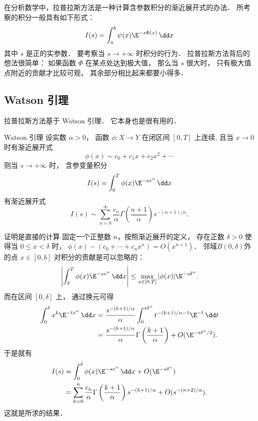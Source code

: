 

在分析数学中，拉普拉斯方法是一种计算含参数积分的渐近展开式的办法． 所考察的积分一般具有如下形式：
\begin{equation}\label{LapAsm_eq1}
I(s)=\int_a^b\psi(x)\E^{-s\Phi(x)}\,\dd x
\end{equation}
其中 $s$ 是正的实参数． 要考察当 $s\to+\infty$ 时积分的行为． 拉普拉斯方法背后的想法很简单： 如果函数 $\Phi$ 在某点处达到极大值， 那么当 $s$ 很大时， 只有极大值点附近的贡献才比较可观， 其余部分相比起来都要小得多．

\subsection{Watson 引理}
拉普拉斯方法基于 Watson 引理． 它本身也是很有用的．

\begin{lemma}{Watson 引理}
设实数 $\alpha>0$， 函数 $\phi:X\to Y$ 在闭区间 $[0,T]$ 上连续, 且当 $x\to0$ 时有渐近展开式
\[
  \phi(x)\sim c_0+c_1x+c_2x^2+\cdots
\]
则当 $s\to+\infty$ 时， 含参变量积分
\[
  I(s)=\int_0^T \phi(x)\E^{-s x^\alpha}\,\dd x
\]
有渐近展开式
\[
  I(s)\sim\sum_{n=0}^\infty \frac{c_n}{\alpha}\Gamma\left(\frac{n+1}{\alpha}\right)s^{-(n+1)/\alpha}.
\]
\end{lemma}

证明是直接的计算 固定一个正整数 $n$，按照渐近展开的定义， 存在正数 $\delta >0$ 使得当 $0\leq x<\delta$ 时， $\phi(x)-(c_0+\cdots+c_nx^n)=O(x^{n+1})$． 邻域$B(0,\delta)$外的点 $x\in[0,b]$ 对积分的贡献是可以忽略的：
\[
  \left|\int_\delta^T\phi(x)\E^{-sx^\alpha}\,\dd x\right|
\leq\max_{x\in[0,T]}|\phi(x)|\E^{-s\delta^\alpha}.
\]
而在区间 $[0,\delta]$ 上， 通过换元可得
$$
\begin{aligned}
\int_0^\delta x^k\E^{-tx^\alpha}\,\dd x
&=\frac{s^{-(k+1)/\alpha}}{\alpha}\int_0^{s\delta^\alpha}t^{-(k+1)/\alpha-1}\E^{-t}\,\dd t\\
&=\frac{s^{-(k+1)/\alpha}}{\alpha}\Gamma\left(\frac{k+1}{\alpha}\right)+O(\E^{-s\delta^\alpha/2}).
\end{aligned}
$$
于是就有
$$
\begin{aligned}
I(s)
&=\int_0^\delta\phi(x)\E^{-sx^\alpha}\,\dd x+O(\E^{-s\delta^\alpha})\\
&=\sum_{k=0}^n\frac{c_n}{\alpha}\Gamma\left(\frac{k+1}{\alpha}\right)s^{-(k+1)/\alpha}+O(s^{-(n+2)/\alpha}).
\end{aligned}
$$
这就是所求的结果．

